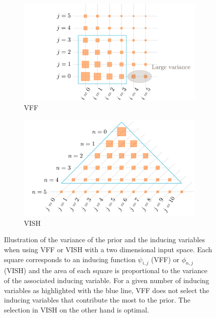 \begin{figure}[tbh!]
  \centering
\begin{subfigure}{0.49\textwidth}
  \includegraphics[width=\textwidth]{VFF_v2}
  \caption{VFF}
  \label{fig:decay-vff}
\end{subfigure}\hfil %
\begin{subfigure}{0.49\textwidth}
  \includegraphics[width=\textwidth]{VISH_v2}
  \caption{VISH}
  \label{fig:decay-vish}
\end{subfigure}\hfil %
\caption{Illustration of the variance of the prior and the inducing variables when using VFF or VISH with a two dimensional input space. Each square corresponds to an inducing function $\psi_{i,j}$ (VFF) or $\phi_{n,j}$ (VISH) and the area of each square is proportional to the variance of the associated inducing variable. For a given number of inducing variables as highlighted with the blue line, VFF does not select the inducing variables that contribute the most to the prior. The selection in VISH on the other hand is optimal.}
\label{fig:decay-vff-vs-vish}
\end{figure}


